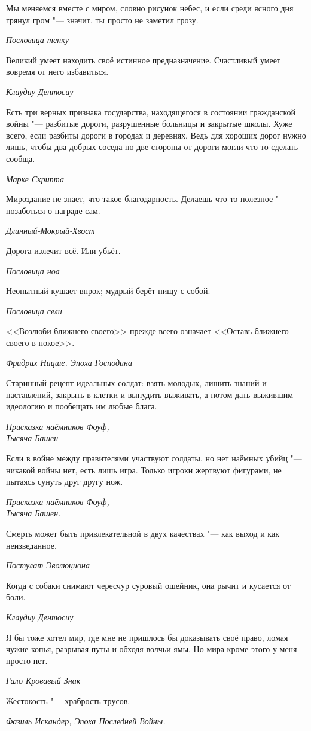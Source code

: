 \documentclass[a4paper,10pt]{book}
\begin{document}
\epigraph{Мы меняемся вместе с миром, словно рисунок небес, и если среди ясного дня грянул гром "--- значит, ты просто не заметил грозу.}
{\textit{Пословица тенку}}

\epigraph{Великий умеет находить своё истинное предназначение. 
Счастливый умеет вовремя от него избавиться.}
{\textit{Клаудиу Дентосиу}}

\epigraph{Есть три верных признака государства, находящегося в состоянии гражданской войны "--- разбитые дороги, разрушенные больницы и закрытые школы.
Хуже всего, если разбиты дороги в городах и деревнях.
Ведь для хороших дорог нужно лишь, чтобы два добрых соседа по две стороны от дороги могли что-то сделать сообща.}
{\textit{Марке Скрипта}}

\epigraph{Мироздание не знает, что такое благодарность. 
Делаешь что-то полезное "--- позаботься о награде сам.}
{\textit{Длинный-Мокрый-Хвост}}

\epigraph{Дорога излечит всё.
Или убьёт.}
{\textit{Пословица ноа}}

\epigraph{Неопытный кушает впрок;
мудрый берёт пищу с собой.}
{\textit{Пословица сели}}

\epigraph{<<Возлюби ближнего своего>> прежде всего означает <<Оставь ближнего своего в покое>>.}
{\textit{Фридрих Ницше. Эпоха Господина}}

\epigraph{Старинный рецепт идеальных солдат: взять молодых, лишить знаний и наставлений, закрыть в клетки и вынудить выживать, а потом дать выжившим идеологию и пообещать им любые блага.}
{\textit{Присказка наёмников Фоуф,\\Тысяча Башен}}

\epigraph{Если в войне между правителями участвуют солдаты, но нет наёмных убийц "--- никакой войны нет, есть лишь игра.
Только игроки жертвуют фигурами, не пытаясь сунуть друг другу нож.}
{\textit{Присказка наёмников Фоуф,\\Тысяча Башен.}}

\epigraph{Смерть может быть привлекательной в двух качествах "--- как выход и как неизведанное.}
{\textit{Постулат Эволюциона}}

\epigraph{Когда с собаки снимают чересчур суровый ошейник, она рычит и кусается от боли.}
{\textit{Клаудиу Дентосиу}}

\epigraph{Я бы тоже хотел мир, где мне не пришлось бы доказывать своё право, ломая чужие копья, разрывая путы и обходя волчьи ямы.
Но мира кроме этого у меня просто нет.}
{\textit{Гало Кровавый Знак}}

\epigraph{Жестокость "--- храбрость трусов.}
{\textit{Фазиль Искандер, Эпоха Последней Войны.}}
\end{document}
